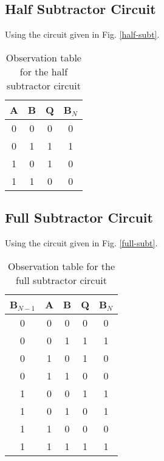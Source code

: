 \subsection{Half Subtractor Circuit}

\noindent Using the circuit given in Fig. \ref{half-subt}.
\begin{table}[H]
    \centering
    \begin{tabular}{|c|c|c|c|}\hline
        A & B & Q & B$_N$ \\ \hline
        0 & 0 & 0 & 0 \\ 
        0 & 1 & 1 & 1 \\ 
        1 & 0 & 1 & 0 \\ 
        1 & 1 & 0 & 0 \\ \hline
    \end{tabular}
    \caption{Observation table for the half subtractor circuit}
\end{table}

\subsection{Full Subtractor Circuit}

\noindent Using the circuit given in Fig. \ref{full-subt}.
\begin{table}[H]
    \centering
    \begin{tabular}{|c|c|c|c|c|}\hline
        B$_{N-1}$ & A & B & Q & B$_N$ \\ \hline
        0 & 0 & 0 & 0 & 0 \\ 
        0 & 0 & 1 & 1 & 1 \\ 
        0 & 1 & 0 & 1 & 0 \\ 
        0 & 1 & 1 & 0 & 0 \\
        1 & 0 & 0 & 1 & 1 \\ 
        1 & 0 & 1 & 0 & 1 \\ 
        1 & 1 & 0 & 0 & 0 \\ 
        1 & 1 & 1 & 1 & 1 \\ \hline
    \end{tabular}
    \caption{Observation table for the full subtractor circuit}
\end{table}

